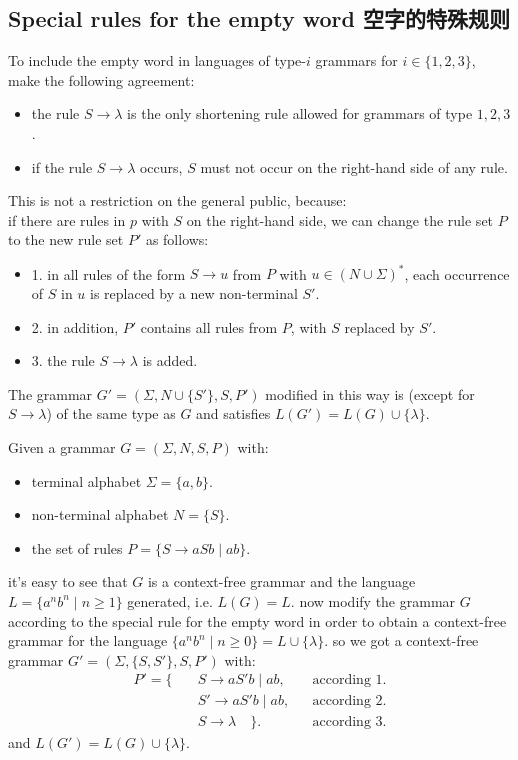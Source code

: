 \documentclass[a4paper,11pt,utf8]{article}
\begin{document}
\subsection{Special rules for the empty word 空字的特殊规则}
To include the empty word in languages of type-$i$ grammars for $i \in \{1,2,3\}$, make the following agreement:
\begin{itemize}
    \item the rule $S \to \lambda$ is the only shortening rule allowed for grammars of type $1,2,3$.
    \item if the rule $S \to \lambda$ occurs, $S$ must not occur on the right-hand side of any rule.
\end{itemize}
\lineindent This is not a restriction on the general public, because: \\ \lineindent
if there are rules in $p$ with $S$ on the right-hand side, we can change the rule set $P$ to the new rule set $P'$ as follows:
\begin{itemize}
    \item 1. in all rules of the form $S \to u$ from $P$ with $u \in (N \cup \Sigma)^*$, each occurrence of $S$ in $u$ is replaced by a new non-terminal $S'$.
    \item 2. in addition, $P'$ contains all rules from $P$, with $S$ replaced by $S'$.
    \item 3. the rule $S \to \lambda$ is added.
\end{itemize}
\lineindent The grammar $G' = (\Sigma, N \cup \{S'\}, S, P')$ modified in this way is (except for $S \to \lambda$) of the same type as $G$ and satisfies $L(G') = L(G) \cup \{\lambda\}$.
\begin{tcolorbox}[title=example,colback=white,colframe=black,width=\textwidth,arc=0pt]
    Given a grammar $G = (\Sigma, N, S, P)$ with:
    \begin{itemize}
        \item terminal alphabet $\Sigma = \{a,b\}$.
        \item non-terminal alphabet $N = \{S\}$.
        \item the set of rules $P = \{S \to aSb \mid ab\}$.
    \end{itemize}
    it's easy to see that $G$ is a context-free grammar and the language $L = \{a^nb^n \mid n \geq 1\}$ generated, i.e. $L(G) = L$. \newindent
    now modify the grammar $G$ according to the special rule for the empty word in order to obtain a context-free grammar for the language $\{a^nb^n \mid n \geq 0\} = L \cup \{\lambda\}$. \newindent
    so we got a context-free grammar $G' = (\Sigma, \{S,S'\}, S, P')$ with:
    \[
        \begin{aligned}
            P' = \{ \quad &S \to a S' b \mid ab, &&\text{according 1.}\\[1ex]
            &S' \to a S' b \mid ab, &&\text{according 2.}\\[1ex]
            &S \to \lambda \quad\}. &&\text{according 3.}
        \end{aligned}
    \]
    \lineindent and $L(G') = L(G) \cup \{\lambda\}$.
\end{tcolorbox}
\end{document}
